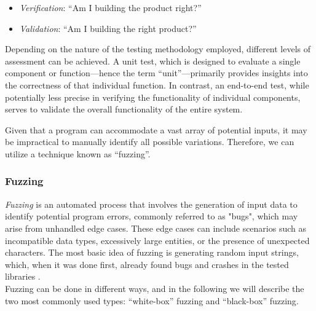 \begin{itemize}[label={}]
    \item \textit{Verification}: “Am I building the product right?” 
    \item \textit{Validation}: “Am I building the right product?”
\end{itemize}
Depending on the nature of the testing methodology employed, different levels of  assessment can be achieved. A unit test, which is designed to evaluate a single component or function—hence the term “unit”—primarily provides insights into the correctness of that individual function. In contrast, an end-to-end test, while potentially less precise in verifying the functionality of individual components, serves to validate the overall functionality of the entire system. 

Given that a program can accommodate a vast array of potential inputs, it may be impractical to manually identify all possible variations. Therefore, we can utilize a technique known as “fuzzing”.

\subsubsection{Fuzzing}
\label{sec:fuzzing}
\textit{Fuzzing} is an automated process that involves the generation of input data to identify potential program errors, commonly referred to as "bugs", which may arise from unhandled edge cases. These edge cases can include scenarios such as incompatible data types, excessively large entities, or the presence of unexpected characters.
The most basic idea of fuzzing is generating random input strings, which, when it was done first, already found bugs and crashes in the tested libraries \cite{miller_empirical_1990}.\\
Fuzzing can be done in different ways, and in the following we will describe the two most commonly used types: “white-box” fuzzing and “black-box” fuzzing.


